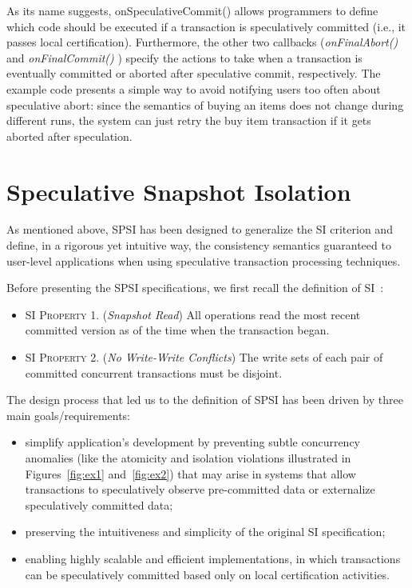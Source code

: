 As its name suggests, onSpeculativeCommit() allows programmers to define which code should be executed if a transaction is speculatively committed (i.e., it passes local certification). Furthermore, the other two callbacks (\textit{onFinalAbort()} and \textit{onFinalCommit()} ) specify the actions to take when a transaction is eventually committed or aborted after speculative commit, respectively. The example code presents a simple way to avoid notifying users too often about speculative abort: since the semantics of buying an items does not change during different runs, the system can just retry the buy item transaction if it gets aborted after speculation.

\section{Speculative Snapshot Isolation}
\label{subsec:ssi}
As mentioned above, SPSI has been designed to generalize the SI criterion and define, in a rigorous yet intuitive way, the consistency semantics guaranteed to user-level applications when using speculative transaction processing techniques.

Before presenting the SPSI specifications, we first recall the definition of SI~\cite{weikum2001transactional}:

\begin{itemize}
\item \textsc{SI Property 1.} (\textit{Snapshot Read}) All operations read the most
recent committed version as of the time when the transaction began.
\item \textsc{SI Property 2.} (\textit{No Write-Write Conflicts}) The write sets of
each pair of committed concurrent transactions must be disjoint.
\end{itemize}

The design process that led us to the definition of SPSI has been driven by three main goals/requirements:
\begin{itemize}
\item simplify application's development by preventing subtle concurrency anomalies (like the atomicity and isolation violations illustrated in Figures~\ref{fig:ex1} and~\ref{fig:ex2}) that may arise in systems that allow transactions to speculatively observe pre-committed data or externalize speculatively committed data;
\item preserving the intuitiveness and simplicity of the original SI specification;
\item enabling highly scalable and efficient implementations, in which transactions can be speculatively committed based only on local certification activities.
\end{itemize}


